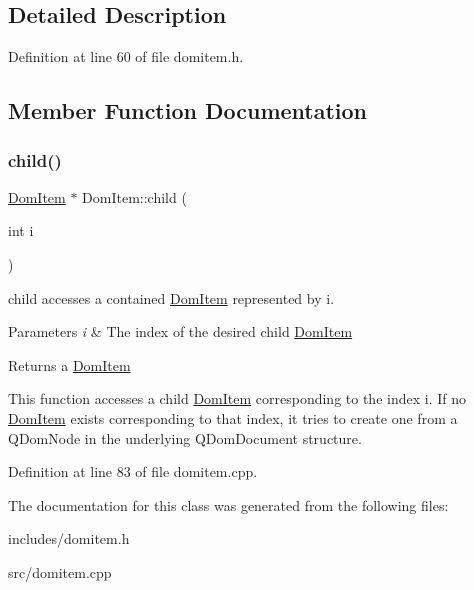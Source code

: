 \subsection{Detailed Description}


Definition at line 60 of file domitem.\+h.



\subsection{Member Function Documentation}
\mbox{\label{classDomItem_af1f0d64a01b07fce3d310fe71da81ca7}} 
\subsubsection{\texorpdfstring{child()}{child()}}
{\footnotesize\ttfamily \hyperlink{classDomItem}{Dom\+Item} $\ast$ Dom\+Item\+::child (\begin{DoxyParamCaption}\item[{int}]{i }\end{DoxyParamCaption})}



child accesses a contained \hyperlink{classDomItem}{Dom\+Item} represented by i. 


\begin{DoxyParams}{Parameters}
{\em i} & The index of the desired child \hyperlink{classDomItem}{Dom\+Item} \\
\hline
\end{DoxyParams}
\begin{DoxyReturn}{Returns}
a \hyperlink{classDomItem}{Dom\+Item}
\end{DoxyReturn}
This function accesses a child \hyperlink{classDomItem}{Dom\+Item} corresponding to the index i. If no \hyperlink{classDomItem}{Dom\+Item} exists corresponding to that index, it tries to create one from a Q\+Dom\+Node in the underlying Q\+Dom\+Document structure. 

Definition at line 83 of file domitem.\+cpp.



The documentation for this class was generated from the following files\+:\begin{DoxyCompactItemize}
\item 
includes/domitem.\+h\item 
src/domitem.\+cpp\end{DoxyCompactItemize}
